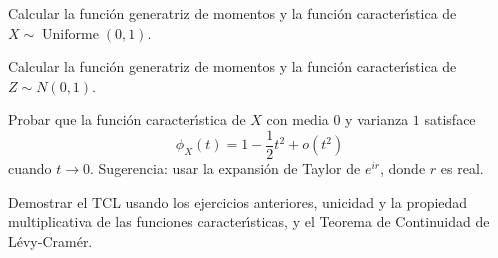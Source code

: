 
\begin{problem}[5] Calcular la funci\'on generatriz de momentos y la funci\'on caracter\'{\i}stica de $X\sim \operatorname{Uniforme}(0,1)$. 
\solution

\begin{expla}

\end{expla}

\end{problem}


\begin{problem}[6]Calcular la funci\'on generatriz de momentos y la funci\'on caracter\'{\i}stica de $Z\sim N(0,1)$. 
 
\solution

\begin{expla}

\end{expla}

\end{problem}


\begin{problem}[7]Probar que la funci\'on caracter\'{\i}stica de $X$ con media 0 y varianza $1$
satisface
$$
\phi_X(t) = 1 - \frac{1}{2} t^2   + o(t^2)
$$ 
cuando $t\to 0$. Sugerencia: usar la expansi\'on de Taylor de $e^{ir}$, donde $r$ es real.
\solution

\begin{expla}

\end{expla}

\end{problem}


\begin{problem}[8] Demostrar el TCL usando los ejercicios anteriores, unicidad y la propiedad multiplicativa de las funciones
caracter\'{\i}sticas, y el Teorema de Continuidad de L\'evy-Cram\'er.
\solution

\begin{expla}

\end{expla}

\end{problem}

